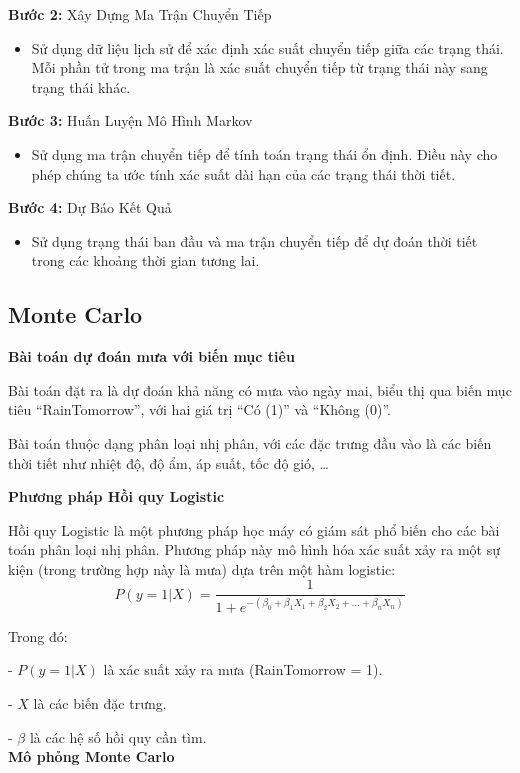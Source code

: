 \documentclass[conference]{IEEEtran}
\begin{document}
\textbf{Bước 2:} Xây Dựng Ma Trận Chuyển Tiếp
\begin{itemize}
    \item Sử dụng dữ liệu lịch sử để xác định xác suất chuyển tiếp giữa các trạng thái. Mỗi phần tử trong ma trận là xác suất chuyển tiếp từ trạng thái này sang trạng thái khác.
\end{itemize}

\textbf{Bước 3:} Huấn Luyện Mô Hình Markov
\begin{itemize}
    \item Sử dụng ma trận chuyển tiếp để tính toán trạng thái ổn định. Điều này cho phép chúng ta ước tính xác suất dài hạn của các trạng thái thời tiết.
\end{itemize}

\textbf{Bước 4:} Dự Báo Kết Quả
\begin{itemize}
    \item Sử dụng trạng thái ban đầu và ma trận chuyển tiếp để dự đoán thời tiết trong các khoảng thời gian tương lai.
\end{itemize}

\subsection{Monte Carlo}
\noindent \textbf{Bài toán dự đoán mưa với biến mục tiêu}

Bài toán đặt ra là dự đoán khả năng có mưa vào ngày mai, biểu thị qua biến mục tiêu “RainTomorrow”, với hai giá trị “Có (1)” và “Không (0)”.

Bài toán thuộc dạng phân loại nhị phân, với các đặc trưng đầu vào là các biến thời tiết như nhiệt độ, độ ẩm, áp suất, tốc độ gió, \ldots

\noindent \textbf{Phương pháp Hồi quy Logistic}

Hồi quy Logistic là một phương pháp học máy có giám sát phổ biến cho các bài toán phân loại nhị phân. Phương pháp này mô hình hóa xác suất xảy ra một sự kiện (trong trường hợp này là mưa) dựa trên một hàm logistic:
\[
P(y = 1 | X) = \frac{1}{1 + e^{-(\beta_0 + \beta_1 X_1 + \beta_2 X_2 + \dots + \beta_n X_n)}}
\]

Trong đó:

-   \( P(y = 1 | X) \) là xác suất xảy ra mưa (RainTomorrow = 1).

- \( X \) là các biến đặc trưng.

- \( \beta \) là các hệ số hồi quy cần tìm.\\
\noindent \textbf{Mô phỏng Monte Carlo}
\end{document}
